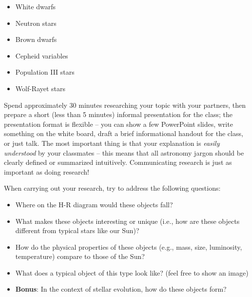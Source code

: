 \documentclass[11pt]{article}
\begin{document}
\begin{itemize}

    \item White dwarfs
    
    \item Neutron stars
    
    \item Brown dwarfs
    
    \item Cepheid variables
    
    \item Population III stars
    
    \item Wolf-Rayet stars
\end{itemize}

\medskip \noindent
Spend approximately 30 minutes researching your topic with your partners, then prepare a short (less than 5 minutes) informal presentation for the class; the presentation format is flexible -- you can show a few PowerPoint slides, write something on the white board, draft a brief informational handout for the class, or just talk. The most important thing is that your explanation is \emph{easily understood} by your classmates -- this means that all astronomy jargon should be clearly defined or summarized intuitively. Communicating research is just as important as doing research!

\medskip \noindent
When carrying out your research, try to address the following questions:
\begin{itemize}
    \item Where on the H-R diagram would these objects fall?
    
    \item What makes these objects interesting or unique (i.e., how are these objects different from typical stars like our Sun)?
    
    \item How do the physical properties of these objects (e.g., mass, size, luminosity, temperature) compare to those of the Sun?
    
    \item What does a typical object of this type look like? (feel free to show an image)
    
    \item \textbf{Bonus}: In the context of stellar evolution, how do these objects form?
\end{itemize}
\end{document}
